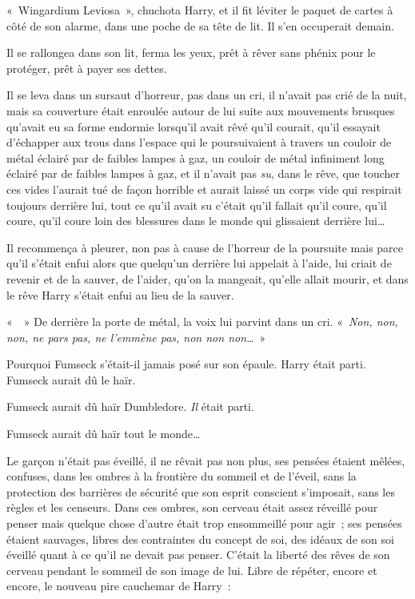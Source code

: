 «~Wingardium Leviosa~», chuchota Harry, et il fit léviter le paquet de cartes à côté de son alarme, dans une poche de sa tête de lit. Il s'en occuperait demain.

Il se rallongea dans son lit, ferma les yeux, prêt à rêver sans phénix pour le protéger, prêt à payer ses dettes.

\later

Il se leva dans un sursaut d'horreur, pas dans un cri, il n'avait pas crié de la nuit, mais sa couverture était enroulée autour de lui suite aux mouvements brusques qu'avait eu sa forme endormie lorsqu'il avait rêvé qu'il courait, qu'il essayait d'échapper aux trous dans l'espace qui le poursuivaient à travers un couloir de métal éclairé par de faibles lampes à gaz, un couloir de métal infiniment long éclairé par de faibles lampes à gaz, et il n'avait pas \emph{su}, dans le rêve, que toucher ces vides l'aurait tué de façon horrible et aurait laissé un corps vide qui respirait toujours derrière lui, tout ce qu'il avait su c'était qu'il fallait qu'il coure, qu'il coure, qu'il coure loin des blessures dans le monde qui glissaient derrière lui…

Il recommença à pleurer, non pas à cause de l'horreur de la poursuite mais parce qu'il s'était enfui alors que quelqu'un derrière lui appelait à l'aide, lui criait de revenir et de la sauver, de l'aider, qu'on la mangeait, qu'elle allait mourir, et dans le rêve Harry s'était enfui au lieu de la sauver.

«~~» De derrière la porte de métal, la voix lui parvint dans un cri. «~\emph{Non, non, non, ne pars pas, ne l'emmène pas, non non non…}~»

Pourquoi Fumseck s'était-il jamais posé sur son épaule. Harry était parti. Fumseck aurait dû le haïr.

Fumseck aurait dû haïr Dumbledore. \emph{Il} était parti.

Fumseck aurait dû haïr tout le monde…

Le garçon n'était pas éveillé, il ne rêvait pas non plus, ses pensées étaient mêlées, confuses, dans les ombres à la frontière du sommeil et de l'éveil, sans la protection des barrières de sécurité que son esprit conscient s'imposait, sans les règles et les censeurs. Dans ces ombres, son cerveau était assez réveillé pour penser mais quelque chose d'autre était trop ensommeillé pour agir~; ses pensées étaient sauvages, libres des contraintes du concept de soi, des idéaux de son soi éveillé quant à ce qu'il ne devait pas penser. C'était la liberté des rêves de son cerveau pendant le sommeil de son image de lui. Libre de répéter, encore et encore, le nouveau pire cauchemar de Harry~:

